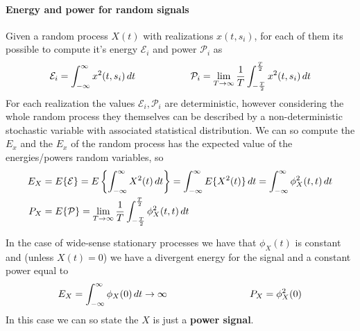 		\paragraph{Energy and power for random signals} Given a random process $X(t)$ with realizations $x(t,s_i)$, for each of them its possible to compute it's energy $\mathcal E_i$ and power $\mathcal P_i$ as
		\begin{equation}
			\mathcal E_i = \int_{-\infty}^\infty x^2(t,s_i)\, dt \hspace{2cm} \mathcal P_i = \lim_{T\rightarrow \infty} \frac 1 T \int_{-\frac T2}^{\frac T2} x^2(t,s_i)\, dt
		\end{equation}
		For each realization the values $\mathcal E_i,\mathcal P_i$ are deterministic, however considering the whole random process they themselves can be described by a non-deterministic stochastic variable with  associated statistical distribution. We can so compute the  $E_x$ and the  $E_x$ of the random process has the expected value of the energies/powers random variables, so
		\begin{equation}
		\begin{aligned}
			E_X & = E\{\mathcal E \} = E\left\{ \int_{-\infty}^\infty X^2(t)\, dt \right\} = \int_{-\infty}^\infty E\{X^2(t)\}\, dt = \int_{-\infty}^\infty \phi_X^2(t,t)\,dt \\
			P_X & = E\{\mathcal P\} = \lim_{T\rightarrow\infty} \frac 1 T \int_{-\frac T2}^{\frac T  2} \phi_X^2(t,t)\, dt
		\end{aligned}
		\end{equation}
		
		In the case of wide-sense stationary processes we have that $\phi_X(t)$ is constant and (unless $X(t) = 0$) we have a divergent energy for the signal and a constant power equal to
		\[ E_X = \intinf \phi_X(0) \,dt \rightarrow \infty \hspace{3cm} P_X = \phi_X^2(0) \]
		In this case we can so state the $X$ is just a \textbf{power signal}.
		
